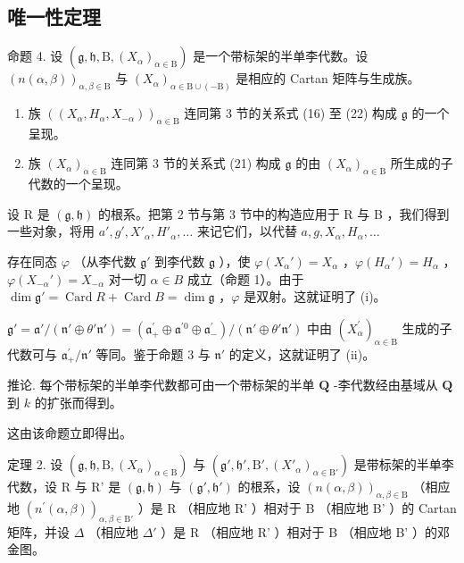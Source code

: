 \subsection{唯一性定理}

命题 4. 设 \((\mathfrak{g},\mathfrak{h},\mathrm{B},(X_{\alpha})_{\alpha\in\mathrm{B}})\) 是一个带标架的半单李代数。设 \((n(\alpha,\beta))_{\alpha,\beta\in\mathrm{B}}\) 与 \((X_{\alpha})_{\alpha\in\mathrm{B}\cup(-\mathrm{B})}\) 是相应的 Cartan 矩阵与生成族。

\begin{enumerate}
\def\labelenumi{(\roman{enumi})}
\item
  族 \(((X_{\alpha}, H_{\alpha}, X_{-\alpha}))_{\alpha \in \mathrm{B}}\) 连同第 3 节的关系式 (16) 至 (22) 构成 \(\mathfrak{g}\) 的一个呈现。
\item
  族 \((X_{\alpha})_{\alpha \in \mathrm{B}}\) 连同第 3 节的关系式 (21) 构成 \(\mathfrak{g}\) 的由 \((X_{\alpha})_{\alpha \in \mathrm{B}}\) 所生成的子代数的一个呈现。
\end{enumerate}

设 R 是 \((\mathfrak{g},\mathfrak{h})\) 的根系。把第 2 节与第 3 节中的构造应用于 R 与 B ，我们得到一些对象，将用 \(a', g', X'_{\alpha}, H'_{\alpha}, \ldots\) 来记它们，以代替 \(a, g, X_{\alpha}, H_{\alpha}, \ldots\)

存在同态 \(\varphi\) （从李代数 \(\mathfrak{g}'\) 到李代数 \(\mathfrak{g}\) ），使 \(\varphi(X_{\alpha}') = X_{\alpha}\) ，\(\varphi(H_{\alpha}') = H_{\alpha}\) ，\(\varphi(X_{-\alpha}') = X_{-\alpha}\) 对一切 \(\alpha \in B\) 成立（命题 1）。由于 \(\dim \mathfrak{g}' = \operatorname{Card} R + \operatorname{Card} B = \dim \mathfrak{g}\) ，\(\varphi\) 是双射。这就证明了 (i)。

\(\mathfrak{g}' = \mathfrak{a}' / (\mathfrak{n}'\oplus \theta'\mathfrak{n}') = (\mathfrak{a}_+^\prime \oplus \mathfrak{a}^{\prime 0}\oplus \mathfrak{a}_-^\prime) / (\mathfrak{n}'\oplus \theta'\mathfrak{n}')\) 中由 \((X_{\alpha}^{\prime})_{\alpha \in \mathrm{B}}\) 生成的子代数可与 \(\mathfrak{a}_+^\prime /\mathfrak{n}'\) 等同。鉴于命题 3 与 \(\mathfrak{n}'\) 的定义，这就证明了 (ii)。

推论. 每个带标架的半单李代数都可由一个带标架的半单 \(\mathbf{Q}\) -李代数经由基域从 \(\mathbf{Q}\) 到 \(k\) 的扩张而得到。

这由该命题立即得出。

定理 2. 设 \((\mathfrak{g},\mathfrak{h},\mathrm{B},(X_{\alpha})_{\alpha \in \mathrm{B}})\) 与 \((\mathfrak{g}',\mathfrak{h}',\mathrm{B}',(X'_{\alpha})_{\alpha \in \mathrm{B}'})\) 是带标架的半单李代数，设 R 与 R' 是 \((\mathfrak{g},\mathfrak{h})\) 与 \((\mathfrak{g}',\mathfrak{h}')\) 的根系，设 \((n(\alpha ,\beta))_{\alpha ,\beta \in \mathrm{B}}\) （相应地 \((n^{\prime}(\alpha ,\beta))_{\alpha ,\beta \in \mathrm{B}'}\) ）是 R （相应地 R' ）相对于 B （相应地 B' ）的 Cartan 矩阵，并设 \(\Delta\) （相应地 \(\Delta'\) ）是 R （相应地 R' ）相对于 B （相应地 B' ）的邓金图。

